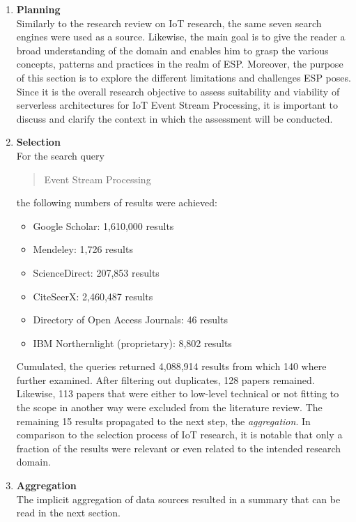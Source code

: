 \begin{enumerate}
    \item
    \textbf{Planning}\\
    Similarly to the research review on \acf{IoT} research, the same seven search engines were used as a source. Likewise, the main goal is to give the reader a broad understanding of the domain and enables him to grasp the various concepts, patterns and practices in the realm of \acf{ESP}. Moreover, the purpose of this section is to explore the different limitations and challenges \acf{ESP} poses. Since it is the overall research objective to assess suitability and viability of serverless architectures for IoT Event Stream Processing, it is important to discuss and clarify the context in which the assessment will be conducted. 
    
    \item
    \textbf{Selection}\\
    For the search query \blockquote{Event Stream Processing} the following numbers of results were achieved:
    
    \begin{itemize}[nolistsep]
        \renewcommand\labelitemi{--}
        \item Google Scholar:  1,610,000 results
        \item Mendeley: 1,726 results
        \item ScienceDirect: 207,853 results
        \item CiteSeerX: 2,460,487 results
        \item Directory of Open Access Journals: 46 results
        \item IBM Northernlight (proprietary): 8,802  results
    \end{itemize}
    
    Cumulated, the queries returned 4,088,914 results from which 140 where further examined. After filtering out duplicates, 128 papers remained. Likewise, 113 papers that were either to low-level technical or not fitting to the scope in another way were excluded from the literature review. The remaining 15 results propagated to the next step, the \textit{aggregation}. In comparison to the selection process of IoT research, it is notable that only a fraction of the results were relevant or even related to the intended research domain.
    
    \item
    \textbf{Aggregation}\\
    The implicit aggregation of data sources resulted in a summary that can be read in the next section.
    

\end{enumerate}
